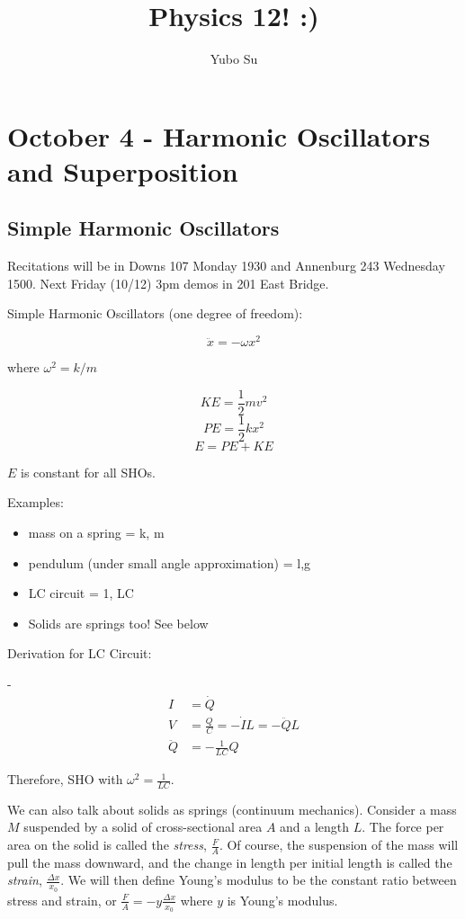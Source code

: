 \documentclass{report}
\begin{document}
\title{Physics 12! :)}
\author{Yubo Su}
\date{ }

\maketitle

\tableofcontents

\chapter{October 4 - Harmonic Oscillators and Superposition}

\section{Simple Harmonic Oscillators}

Recitations will be in Downs 107 Monday 1930 and Annenburg 243 Wednesday 1500. Next Friday (10/12) 3pm demos in 201 East Bridge.

Simple Harmonic Oscillators (one degree of freedom):

$$\ddot{x} = -\omega x^2$$

where $\omega^2 = k/m$ 

$$KE = \frac{1}{2} mv^2$$
$$PE = \frac{1}{2} kx^2$$
$$E = PE + KE$$

$E$ is constant for all SHOs.

Examples:

\begin{itemize}
\item mass on a spring = k, m
\item pendulum (under small angle approximation) = l,g
\item LC circuit = 1, LC
\item Solids are springs too! See below
\end{itemize}

Derivation for LC Circuit:

-\begin{align*}
I &= \dot{Q}\\
V &= \frac{Q}{C} = -\dot{I}L = -\ddot{Q}L\\
\ddot{Q} &= -\frac{1}{LC}Q
\end{align*}

Therefore, SHO with $\omega^2 = \frac{1}{LC}$.

We can also talk about solids as springs (continuum mechanics). Consider a mass $M$ suspended by a solid of cross-sectional area $A$ and a length $L$. The force per area on the solid is called the \emph{stress}, $\frac{F}{A}$. Of course, the suspension of the mass will pull the mass downward, and the change in length per initial length is called the \emph{strain}, $\frac{\Delta x}{x_0}$. We will then define Young's modulus to be the constant ratio between stress and strain, or $\frac{F}{A} = -y \frac{\Delta x}{x_0}$ where $y$ is Young's modulus.
\end{document}
